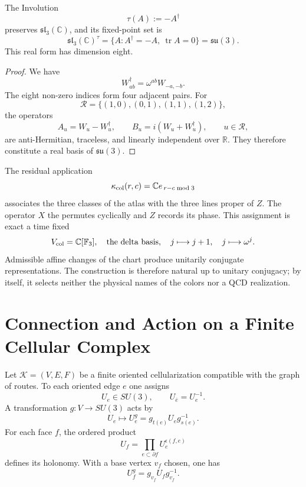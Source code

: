 \begin{corollary}
\label{cor:su3-color-qutrit}
The Involution
\[
 \tau(A):=-A^\dagger
\]
preserves \(\mathfrak{sl}_3(\mathbb C)\), and its fixed-point set is
\[
 \mathfrak{sl}_3(\mathbb C)^\tau
 =\{A:A^\dagger=-A,\ \operatorname{tr}A=0\}
 =\mathfrak{su}(3).
\]
This real form has dimension eight.
\end{corollary}

\begin{proof}
We have
\[
 W_{ab}^{\dagger}=\omega^{ab}W_{-a,-b}.
\]
The eight non-zero indices form four adjacent pairs. For
\[
 \mathcal R=\{(1,0),(0,1),(1,1),(1,2)\},
\]
the operators
\[
 A_u=W_u-W_u^\dagger,
 \qquad
 B_u=i(W_u+W_u^\dagger),
 \qquad u\in\mathcal R,
\]
are anti-Hermitian, traceless, and linearly independent over
\(\mathbb R\). They therefore constitute a real basis of
\(\mathfrak{su}(3)\).
\end{proof}

The residual application
\[
 \kappa_{\rm col}(r,c)
 =\mathbb C e_{\,r-c\bmod3}
\]
associates the three classes of the atlas with the three lines proper of \(Z\). The
operator \(X\) the permutes cyclically and \(Z\) records its phase. This
assignment is exact a time fixed
\[
 V_{\rm col}=\mathbb C[\mathbb F_3],
 \quad
 \text{the delta basis},
 \quad
 j\longmapsto j+1,
 \quad
 j\longmapsto\omega^j.
\]
Admissible affine changes of the chart produce unitarily conjugate
representations. The construction is therefore natural up to
unitary conjugacy; by itself, it selects neither the physical names of the
colors nor a QCD realization.

\section{Connection and Action on a Finite Cellular Complex}
\label{sec:gauge-finito-color}

\begin{construction}
\label{cons:gauge-finito-color}
Let \(\mathcal K=(V,E,F)\) be a finite oriented cellularization compatible with
the graph of routes. To each oriented edge \(e\) one assigns
\[
 U_e\in SU(3),
 \qquad
 U_{\bar e}=U_e^{-1}.
\]
A transformation \(g:V\to SU(3)\) acts by
\[
 U_e\longmapsto U_e^g
 =g_{t(e)}U_eg_{s(e)}^{-1}.
\]
For each face \(f\), the ordered product
\[
 U_f=\prod_{e\subset\partial f}U_e^{\epsilon(f,e)}
\]
defines its holonomy. With a base vertex \(v_f\) chosen, one has
\[
 U_f^g=g_{v_f}U_fg_{v_f}^{-1}.
\]
\end{construction}

